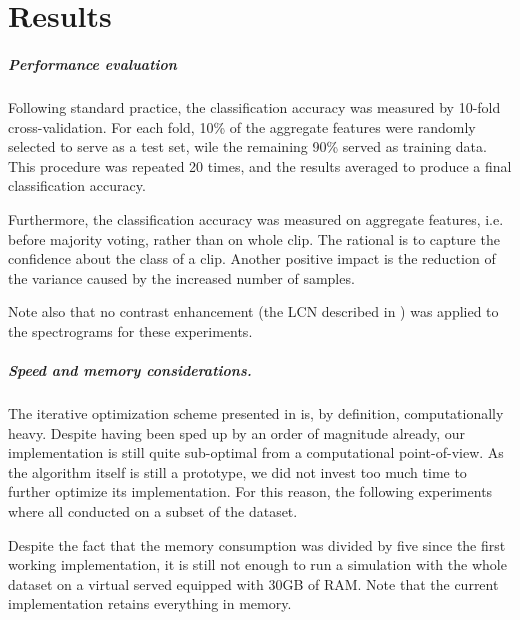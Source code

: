

\chapter{Results} \label{chap:results}

\paragraph{Performance evaluation}
Following standard practice, the classification accuracy was measured by 10-fold cross-validation. For each fold, 10\% of the aggregate features were randomly selected to serve as a test set, wile the remaining 90\% served as training data. This procedure was repeated 20 times, and the results averaged to produce a final classification accuracy.

Furthermore, the classification accuracy was measured on aggregate features, i.e. before majority voting, rather than on whole clip. The rational is to capture the confidence about the class of a clip. Another positive impact is the reduction of the variance caused by the increased number of samples.

Note also that no contrast enhancement (the \gls{LCN} described in ) was applied to the spectrograms for these experiments.

\paragraph{Speed and memory considerations.}
The iterative optimization scheme presented in  is, by definition, computationally heavy. Despite having been sped up by an order of magnitude already, our implementation is still quite sub-optimal from a computational point-of-view. As the algorithm itself is still a prototype, we did not invest too much time to further optimize its implementation. For this reason, the following experiments where all conducted on a subset of the dataset.

Despite the fact that the memory consumption was divided by five since the first working implementation, it is still not enough to run a simulation with the whole dataset on a virtual served equipped with 30GB of RAM. Note that the current implementation retains everything in memory.

